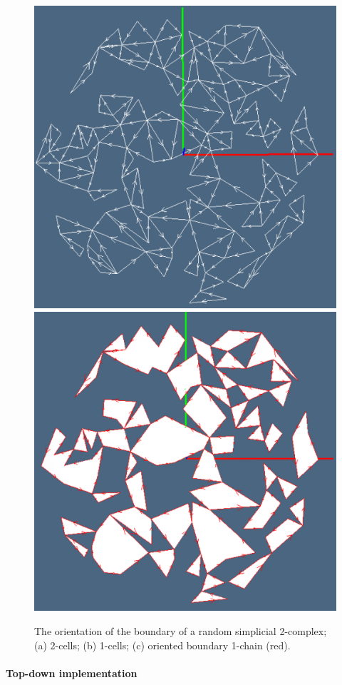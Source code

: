 \documentclass[11pt,oneside]{article}	%
\begin{document}
\begin{figure}[htbp]
   \includegraphics[height=0.328\linewidth,width=0.328\linewidth]{images/randomdelaunay2} 
   \includegraphics[height=0.328\linewidth,width=0.328\linewidth]{images/randomdelaunay3} 
   \caption{The orientation of the boundary of a random simplicial 2-complex;
   (a) 2-cells; (b) 1-cells; (c) oriented boundary 1-chain (red).}
   \label{randomdelaunay}
\end{figure}


\paragraph{Top-down implementation}
\end{document}
